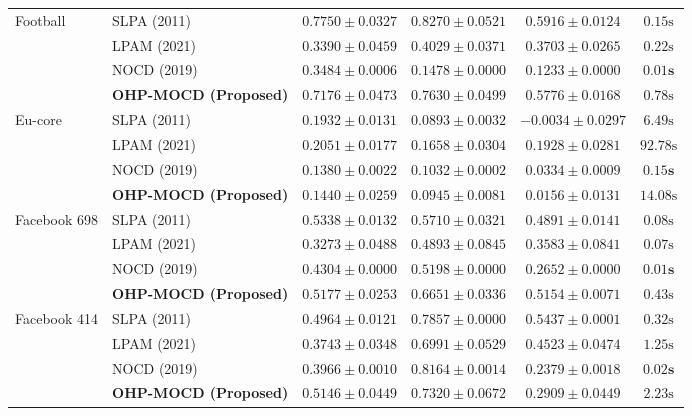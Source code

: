 \documentclass{svproc}
\begin{document}
\begin{table}[t]
{\begin{tabular}{@{}llcccc@{}}
\midrule
Football & SLPA (2011) & $\mathbf{0.7750 \pm 0.0327}$ & $\mathbf{0.8270 \pm 0.0521}$ & $\mathbf{0.5916 \pm 0.0124}$ & $0.15\text{s}$ \\
 & LPAM (2021) & $0.3390 \pm 0.0459$ & $0.4029 \pm 0.0371$ & $0.3703 \pm 0.0265$ & $0.22\text{s}$ \\
 & NOCD (2019) & $0.3484 \pm 0.0006$ & $0.1478 \pm 0.0000$ & $0.1233 \pm 0.0000$ & $\mathbf{0.01\text{s}}$ \\
 & \textbf{OHP-MOCD (Proposed)} & $0.7176 \pm 0.0473$ & $0.7630 \pm 0.0499$ & $0.5776 \pm 0.0168$ & $0.78\text{s}$ \\
\midrule
Eu-core & SLPA (2011) & $0.1932 \pm 0.0131$ & $0.0893 \pm 0.0032$ & $-0.0034 \pm 0.0297$ & $6.49\text{s}$ \\
 & LPAM (2021) & $\mathbf{0.2051 \pm 0.0177}$ & $\mathbf{0.1658 \pm 0.0304}$ & $\mathbf{0.1928 \pm 0.0281}$ & $92.78\text{s}$ \\
 & NOCD (2019) & $0.1380 \pm 0.0022$ & $0.1032 \pm 0.0002$ & $0.0334 \pm 0.0009$ & $\mathbf{0.15\text{s}}$ \\
 & \textbf{OHP-MOCD (Proposed)} & $0.1440 \pm 0.0259$ & $0.0945 \pm 0.0081$ & $0.0156 \pm 0.0131$ & $14.08\text{s}$ \\
\midrule
Facebook 698 & SLPA (2011) & $\mathbf{0.5338 \pm 0.0132}$ & $0.5710 \pm 0.0321$ & $0.4891 \pm 0.0141$ & $0.08\text{s}$ \\
 & LPAM (2021) & $0.3273 \pm 0.0488$ & $0.4893 \pm 0.0845$ & $0.3583 \pm 0.0841$ & $0.07\text{s}$ \\
 & NOCD (2019) & $0.4304 \pm 0.0000$ & $0.5198 \pm 0.0000$ & $0.2652 \pm 0.0000$ & $\mathbf{0.01\text{s}}$ \\
 & \textbf{OHP-MOCD (Proposed)} & $0.5177 \pm 0.0253$ & $\mathbf{0.6651 \pm 0.0336}$ & $\mathbf{0.5154 \pm 0.0071}$ & $0.43\text{s}$ \\
\midrule
Facebook 414 & SLPA (2011) & $0.4964 \pm 0.0121$ & $0.7857 \pm 0.0000$ & $\mathbf{0.5437 \pm 0.0001}$ & $0.32\text{s}$ \\
 & LPAM (2021) & $0.3743 \pm 0.0348$ & $0.6991 \pm 0.0529$ & $0.4523 \pm 0.0474$ & $1.25\text{s}$ \\
 & NOCD (2019) & $0.3966 \pm 0.0010$ & $\mathbf{0.8164 \pm 0.0014}$ & $0.2379 \pm 0.0018$ & $\mathbf{0.02\text{s}}$ \\
 & \textbf{OHP-MOCD (Proposed)} & $\mathbf{0.5146 \pm 0.0449}$ & $0.7320 \pm 0.0672$ & $0.2909 \pm 0.0449$ & $2.23\text{s}$ \\

\end{tabular}}
\end{table}
\end{document}
